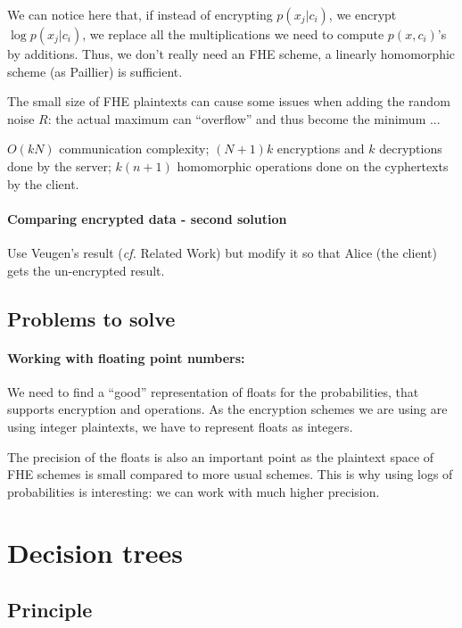 \documentclass[11pt]{article}
\begin{document}
	We can notice here that, if instead of encrypting $p(x_j|c_i)$, we encrypt $\log p(x_j|c_i)$, we replace all the multiplications we need to compute $p(x,c_i)$'s by additions. Thus, we don't really need an FHE scheme, a linearly homomorphic scheme (as Paillier) is sufficient. 
	
	The small size of FHE plaintexts can cause some issues when adding the random noise $R$: the actual maximum can ``overflow'' and thus become the minimum ...
	
	$O(kN)$ communication complexity; $(N+1)k$ encryptions and $k$ decryptions done by the server; $k(n+1)$ homomorphic operations done on the cyphertexts by the client.
	   
	\paragraph{Comparing encrypted data - second solution}
	Use Veugen's result (\emph{cf.} Related Work) but modify it so that Alice (the client) gets the un-encrypted result. 
	  
          
\subsection{Problems to solve} %
\label{sub:problems_bayes}
\paragraph{Working with floating point numbers:} We need to find a ``good'' representation of floats for the probabilities, that supports encryption and operations. As the encryption schemes we are using are using integer plaintexts, we have to represent floats as integers. 

The precision of the floats is also an important point as the plaintext space of FHE schemes is small compared to more usual schemes. This is why using logs of probabilities is interesting: we can work with much higher precision. 


\section{Decision trees} %
\label{sec:decision_trees}

\subsection{Principle} %
\label{sub:decision_tree_principle}
 
\end{document}
